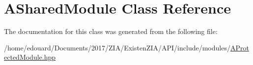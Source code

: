 \hypertarget{classASharedModule}{}\section{A\+Shared\+Module Class Reference}
\label{classASharedModule}


The documentation for this class was generated from the following file\+:\begin{DoxyCompactItemize}
\item 
/home/edouard/\+Documents/2017/\+Z\+I\+A/\+Existen\+Z\+I\+A/\+A\+P\+I/include/modules/\mbox{\hyperlink{AProtectedModule_8hpp}{A\+Protected\+Module.\+hpp}}\end{DoxyCompactItemize}
